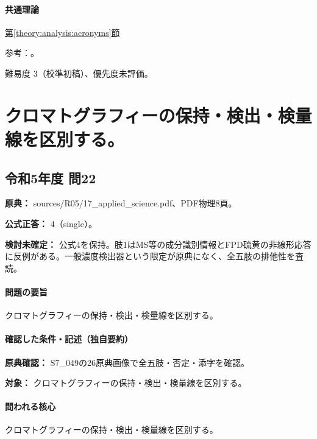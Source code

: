\paragraph{共通理論} \hyperref[theory:analysis:acronyms]{第\ref*{theory:analysis:acronyms}節}

\par 参考：\cite{analysis49_ir_ref,analysis49_epma_ref,analysis49_naa_ref}。

\par 難易度 3（校準初稿）、優先度未評価。

\section{クロマトグラフィーの保持・検出・検量線を区別する。}

\subsection{令和5年度 問22}
\label{q:r05-reg-applied-22}

\noindent\textbf{原典：} sources/R05/17\_applied\_science.pdf、PDF物理8頁。

\textbf{公式正答：} 4（single）。

\par\textbf{検討未確定：} 公式4を保持。肢1はMS等の成分識別情報とFPD硫黄の非線形応答に反例がある。一般濃度検出器という限定が原典になく、全五肢の排他性を査読。

\paragraph{問題の要旨} クロマトグラフィーの保持・検出・検量線を区別する。

\paragraph{確認した条件・記述（独自要約）}\mbox{}\par

\noindent\textbf{原典確認：} S7\_049の26原典画像で全五肢・否定・添字を確認。\par

\noindent\textbf{対象：} クロマトグラフィーの保持・検出・検量線を区別する。\par

\paragraph{問われる核心} クロマトグラフィーの保持・検出・検量線を区別する。

